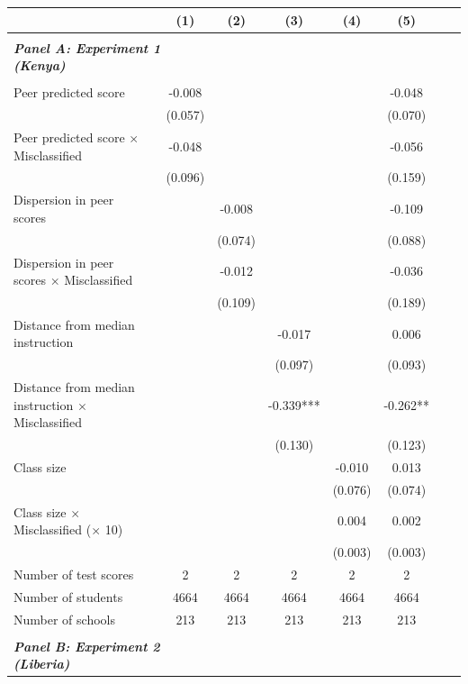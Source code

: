 \begin{center} 
\caption{\small Effect on test scores} 
\label{tab:descriptives} 
\begin{scriptsize}
\begin{threeparttable}
\begin{tabular} {@{} l l c c c c c c c  @{}} \toprule \toprule
& &(1)&(2)&(3)&(4)&(5) \\ \midrule 
\\
\multicolumn{3}{l}{\textbf{\textit{Panel A: Experiment 1 (Kenya)}}} \\
\\
Peer predicted score &  & -0.008 &  &  &  & -0.048 \\
                 &  & (0.057) &  &  &  & (0.070) \\
Peer predicted score $\times$ Misclassified &  & -0.048 &  &  &  & -0.056 \\
                 &  & (0.096) &  &  &  & (0.159) \\
Dispersion in peer scores &  &  & -0.008 &  &  & -0.109 \\
                 &  &  & (0.074) &  &  & (0.088) \\
Dispersion in peer scores $\times$ Misclassified &  &  & -0.012 &  &  & -0.036 \\
                 &  &  & (0.109) &  &  & (0.189) \\
Distance from median instruction &  &  &  & -0.017 &  & 0.006 \\
                 &  &  &  & (0.097) &  & (0.093) \\
Distance from median instruction $\times$ Misclassified &  &  &  & -0.339*** &  & -0.262** \\
                 &  &  &  & (0.130) &  & (0.123) \\
Class size &  &  &  &  & -0.010 & 0.013 \\
                 &  &  &  &  & (0.076) & (0.074) \\
Class size $\times$ Misclassified ($\times$ 10) &  &  &  &  & 0.004 & 0.002 \\
                 &  &  &  &  & (0.003) & (0.003) \\
\midrule
Number of test scores &  & 2 & 2 & 2 & 2 & 2 \\
Number of students &  & 4664 & 4664 & 4664 & 4664 & 4664 \\
Number of schools &  & 213 & 213 & 213 & 213 & 213 \\
 \midrule
\\
\multicolumn{3}{l}{\textbf{\textit{Panel B: Experiment 2 (Liberia)}}} \\

\end{tabular}
\end{threeparttable}
\end{scriptsize}
\end{center}

